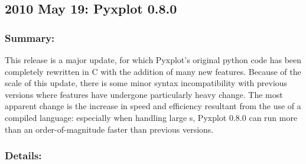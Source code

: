 \subsection*{2010 May 19: Pyxplot 0.8.0}

\subsubsection*{Summary:}

This release is a major update, for which Pyxplot's original python code has
been completely rewritten in C with the addition of many new features. Because
of the scale of this update, there is some minor syntax incompatibility with
previous versions where features have undergone particularly heavy change. The
most apparent change is the increase in speed and efficiency resultant from the
use of a compiled language: especially when handling large \datafile s, Pyxplot
0.8.0 can run more than an order-of-magnitude faster than previous versions.

\subsubsection*{Details:}

